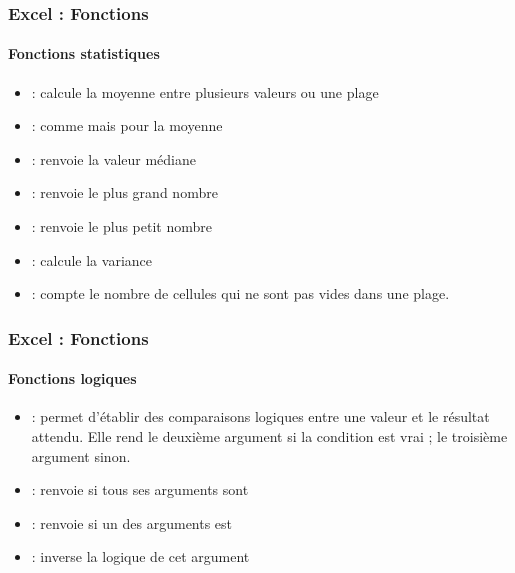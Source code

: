 \documentclass[xcolor=table, usenames,dvipsnames]{beamer}
\begin{document}
\begin{frame}
\frametitle{Excel : Fonctions}
\framesubtitle{Fonctions statistiques}

\begin{minipage}{0.69\textwidth}
	\begin{itemize}
		\item {} : calcule la moyenne entre plusieurs valeurs ou une plage
		\item {} : comme  mais pour la moyenne
		\item {} : renvoie la valeur médiane
		\item {} : renvoie le plus grand nombre
		\item {} : renvoie le plus petit nombre
		\item {} : calcule la variance
		\item {} : compte le nombre de cellules qui ne sont pas vides dans une plage.
	\end{itemize}
\end{minipage}
%
\begin{minipage}{0.3\textwidth} 
	
	
	
\end{minipage}

\end{frame}

\begin{frame}
\frametitle{Excel : Fonctions}
\framesubtitle{Fonctions logiques}

\begin{minipage}{0.69\textwidth}
	\begin{itemize}
		\item {} : permet d'établir des comparaisons logiques entre une valeur et le résultat attendu. Elle rend le deuxième argument si la condition est vrai ; le troisième argument sinon.
		\item {} : renvoie  si tous ses arguments sont 
		\item {} : renvoie  si un des arguments est 
		\item {} : inverse la logique de cet argument
	\end{itemize}
\end{minipage}
%
\begin{minipage}{0.3\textwidth} 
	
	
	
\end{minipage}

\end{frame}
\end{document}
